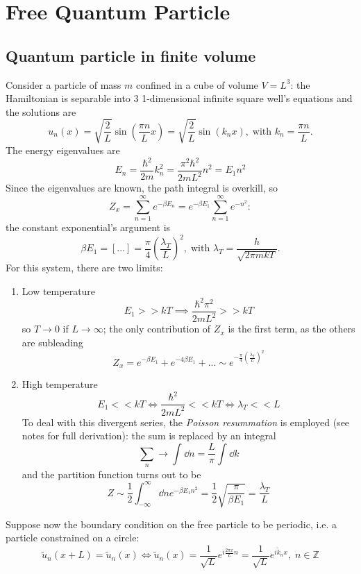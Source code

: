 
\section{Free Quantum Particle}
\subsection{Quantum particle in finite volume}
Consider a particle of mass $m$ confined in a cube of volume $V=L^3$: the
Hamiltonian is separable into $3$ 1-dimensional infinite square well's equations
and the solutions are
\[
    u_n(x)=\sqrt{\frac{2}{L}}\sin\left(\frac{\pi n}{L}x\right) =
    \sqrt{\frac{2}{L}}\sin\left(k_nx\right),\;\text{with }k_n=\frac{\pi n}{L}.
\]
The energy eigenvalues are
\[
    E_n=\frac{\hbar ^2}{2m}k_n^2 = \frac{\pi^2\hbar^2}{2mL^2}n^2=E_1n^2
\]
Since the eigenvalues are known, the path integral is overkill, so
\[
    Z_x=\sum_{n=1}^{\infty} e^{-\beta E_n} = e^{-\beta E_1}
    \sum_{n=1}^{\infty} e^{-n^2}:
\]
the constant exponential's argument is
\[
    \beta E_1 = [...] = \frac{\pi}{4} \left(\frac{\lambda_T}{L}\right)^2,\;
    \text{with }\lambda_T = \frac{h}{\sqrt{2\pi mkT}}.
\]
For this system, there are two limits:
\begin{enumerate}
    \item Low temperature
        \[
            E_1>>kT\implies \frac{\hbar^2\pi^2}{2mL^2}>>kT
        \]
        so $T\to 0$ if $L\to\infty$; the only contribution of $Z_x$ is the first
        term, as the others are subleading
        \[
            Z_x = e^{-\beta E_1} + e^{-4\beta E_1}+...\sim e^{-\frac{\pi}{4}\left(
            \frac{\lambda_T}{L}\right)^2}
        \]
    \item High temperature
        \[
            E_1<<kT \iff \frac{\hbar ^2}{2mL^2}<<kT\iff \lambda_T<<L
        \]
        To deal with this divergent series, the \textit{Poisson resummation} is
        employed (see notes for full derivation): the sum is replaced by an
        integral
        \[
            \sum_{n}^{} \to \int_{}^{} \dd n = \frac{L}{\pi}\int_{}^{} \dd k
        \]
        and the partition function turns out to be
        \[
            Z\sim \frac{1}{2}\int_{-\infty}^{\infty} \dd n e^{-\beta E_1n^2}
            =\frac{1}{2}\sqrt{\frac{\pi}{\beta E_1}} = \frac{\lambda_T}{L}
        \]
\end{enumerate}
Suppose now the boundary condition on the free particle to be periodic, i.e. 
a particle constrained on a circle: 
\[
    \tilde u_n(x+L)=\tilde u_n(x) \iff \tilde u_n(x)=\frac{1}{\sqrt{L}}
    e^{i\frac{2\pi x}{L}n}=\frac{1}{\sqrt{L}}e^{i\tilde k_n x},\; n\in\mathbb{Z}
\]

